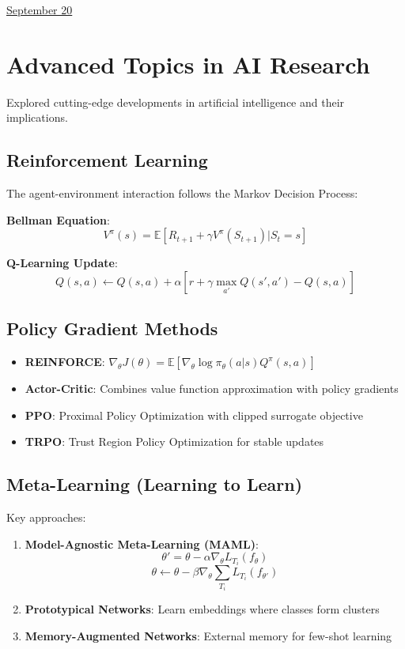 \documentclass[11pt,letterpaper]{article}
\begin{document}
\href{run:2025-09-20-advanced-topics.tex}{\Huge September 20} %

\section{Advanced Topics in AI Research}

Explored cutting-edge developments in artificial intelligence and their implications.

\subsection{Reinforcement Learning}
The agent-environment interaction follows the Markov Decision Process:

\textbf{Bellman Equation}:
$$V^\pi(s) = \mathbb{E}[R_{t+1} + \gamma V^\pi(S_{t+1}) | S_t = s]$$

\textbf{Q-Learning Update}:
$$Q(s, a) \leftarrow Q(s, a) + \alpha[r + \gamma \max_{a'} Q(s', a') - Q(s, a)]$$

\subsection{Policy Gradient Methods}
\begin{itemize}
    \item \textbf{REINFORCE}: $\nabla_\theta J(\theta) = \mathbb{E}[\nabla_\theta \log \pi_\theta(a|s) Q^\pi(s,a)]$
    \item \textbf{Actor-Critic}: Combines value function approximation with policy gradients
    \item \textbf{PPO}: Proximal Policy Optimization with clipped surrogate objective
    \item \textbf{TRPO}: Trust Region Policy Optimization for stable updates
\end{itemize}

\subsection{Meta-Learning (Learning to Learn)}
Key approaches:
\begin{enumerate}
    \item \textbf{Model-Agnostic Meta-Learning (MAML)}: 
    $$\theta' = \theta - \alpha \nabla_\theta L_{T_i}(f_\theta)$$
    $$\theta \leftarrow \theta - \beta \nabla_\theta \sum_{T_i} L_{T_i}(f_{\theta'})$$
    
    \item \textbf{Prototypical Networks}: Learn embeddings where classes form clusters
    \item \textbf{Memory-Augmented Networks}: External memory for few-shot learning
\end{enumerate}
\end{document}
